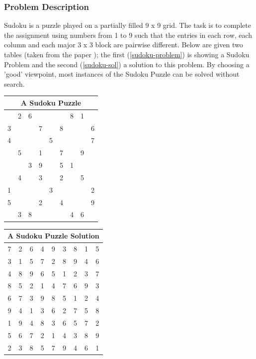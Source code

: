 \documentclass[a4paper,halfparskip]{scrartcl}
\begin{document}
\subsubsection{Problem Description}
Sudoku is a puzzle played on a partially filled 9 x 9 grid. The task 
is to complete the assignment using numbers from 1 to 9 such that the 
entries in each row, each column and each major 3 x 3 block are pairwise 
different. Below are given two tables (taken from the paper
\cite{8}); the first (\ref{sudoku-problem}) 
is showing a Sudoku Problem
and the second (\ref{sudoku-sol}) a solution to this problem.
By choosing  a 'good' viewpoint, most instances of the Sudoku Puzzle can be
solved without search.

\begin{tabular}{||c|c|c||c|c|c||c|c|c||}
\hline
\multicolumn{9}{||c||}{A Sudoku Puzzle \label{sudoku-problem}}\\
\hline
\hline
  & 2 & 6 &   &   &   & 8 & 1 &  \\
\hline
3 &   &   & 7 &   & 8 &   &   & 6\\
\hline
4 &   &   &   & 5 &   &   &   & 7\\
\hline
\hline
  & 5 &   & 1 &   & 7 &   & 9 &  \\
\hline
  &   & 3 & 9 &   & 5 & 1 &   &  \\
\hline
  & 4 &   & 3 &   & 2 &   & 5 &  \\
\hline
\hline
1 &   &   &   & 3 &   &   &   & 2\\
\hline
5 &   &   & 2 &   & 4 &   &   & 9\\
\hline
  & 3 & 8 &   &   &   & 4 & 6 &  \\
\hline   
\end{tabular}

\begin{tabular}{||c|c|c||c|c|c||c|c|c||}
\hline
\multicolumn{9}{||c||}{A Sudoku Puzzle Solution \label{sudoku-sol}}\\
\hline
\hline
7 & 2 & 6 & 4 & 9 & 3 & 8 & 1 & 5\\
\hline
3 & 1 & 5 & 7 & 2 & 8 & 9 & 4 & 6\\
\hline
4 & 8 & 9 & 6 & 5 & 1 & 2 & 3 & 7\\
\hline
\hline
8 & 5 & 2 & 1 & 4 & 7 & 6 & 9 & 3\\
\hline
6 & 7 & 3 & 9 & 8 & 5 & 1 & 2 & 4\\
\hline
9 & 4 & 1 & 3 & 6 & 2 & 7 & 5 & 8\\
\hline
\hline
1 & 9 & 4 & 8 & 3 & 6 & 5 & 7 & 2\\
\hline
5 & 6 & 7 & 2 & 1 & 4 & 3 & 8 & 9\\
\hline
2 & 3 & 8 & 5 & 7 & 9 & 4 & 6 & 1\\
\hline   
\end{tabular}
\end{document}
